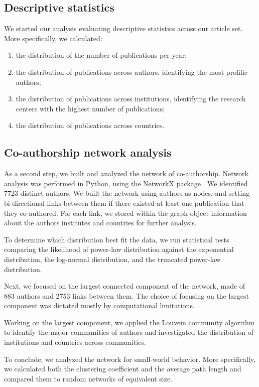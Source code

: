 \documentclass[jmse,review,submit,pdftex,moreauthors]{Definitions/mdpi}
\begin{document}
\subsection{Descriptive statistics}
We started our analysis evaluating descriptive statistics across our article set. More specifically, we calculated:
\begin{enumerate}
	\item the distribution of the number of publications per year;
	\item the distribution of publications across authors, identifying the most prolific authors;
	\item the distribution of publications across institutions, identifying the research centers with the highest number of publications;
	\item the distribution of publications across countries.
\end{enumerate}

\subsection{Co-authorship network analysis}
As a second step, we built and analyzed the network of co-authorship. Network analysis was performed in Python, using the NetworkX package \citep{hagberg2008exploring}. We identified 7723 distinct authors. We built the network using authors as nodes, and setting bi-directional links between them if there existed at least one publication that they co-authored. For each link, we stored within the graph object information about the authors institutes and countries for further analysis.

To determine which distribution best fit the data, we run statistical tests comparing the likelihood of power-law distribution against the exponential distribution, the log-normal distribution, and the truncated power-law distribution.

Next, we focused on the largest connected component of the network, made of 883 authors and 2753 links between them. The choice of focusing on the largest component was dictated mostly by computational limitations.

Working on the largest component, we applied the Louvein community \citep{blondel2008fast} algorithm to identify the major communities of authors and investigated the distribution of institutions and countries across communities.

To conclude, we analyzed the network for small-world behavior. More specifically, we calculated both the clustering coefficient and the average path length and compared them to random networks of equivalent size.
\end{document}
